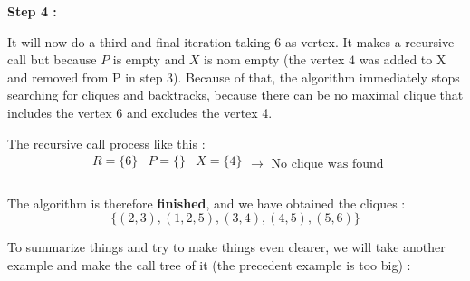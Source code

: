 \hspace*{1cm}  \textbf{Step 4 :}
\\
\begin{minipage}{0.4\textwidth}
\end{minipage}
\begin{minipage}{0.6\textwidth}
    It will now do a third and final iteration taking 6 as vertex. It makes a recursive call but because $P$ is empty and $X$ is nom empty (the vertex $4$ was added to X and removed from P in step 3). Because of that, the algorithm immediately stops searching for cliques and backtracks, because there can be no maximal clique that includes the  vertex 6 and excludes the vertex 4.
\end{minipage}
The recursive call process like this  :
$$ \boxed{
        \begin{array}{lll}
            R = \{6\} & P = \{\} & X = \{4\} \\
        \end{array}
        \rightarrow \text{ No clique was found}
    }$$
\\
The algorithm is therefore \textbf{finished}, and we have obtained the cliques :
$$\{(2,3),(1,2,5),(3,4),(4,5),(5,6)\}$$

To summarize things and try to make things even clearer, we will take another example and make the call tree of it (the precedent example is too big) :

